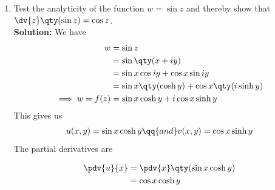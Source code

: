 \begin{enumerate}
			\begin{multicols}{2}
				\begin{align*}
					\pdv{v}{x}&=\pdv{x}\qty(e^x\sin{y}) \\
						&=e^x\sin{y}
				\end{align*}
				
				\begin{align*}
					\pdv{v}{y}&=\pdv{y}\qty(e^x\sin{y}) \\
						&=e^x\cos{y}
				\end{align*}
			\end{multicols}
			From the above partial derivatives, we find that
			\begin{align*}
				\pdv{u}{x}=\pdv{v}{y}\qq{and}\pdv{u}{y}=-\pdv{v}{x}
			\end{align*}
			Hence the Cauchy-Riemann conditions are satisfied. Also the partial derivatives $\pdv{u}{x}$, $\pdv{u}{y}$, $\pdv{v}{x}$ and $\pdv{v}{y}$ are continuous everywhere.
			
			Therefore the complex function $f(z)=e^x\qty(\cos{y}+i\sin{y})$ is analytic everywhere.
			
			Finally, the derivative of the given function is obtained as
			\begin{align*}
				f'(z)&=\pdv{u}{x}+i\pdv{v}{x} \\
					&=e^x\cos{y}+ie^x\sin{y} \\
				\implies f'(z)&=e^x\qty(\cos{y}+i\sin{y})
			\end{align*}
			
			\item Test the analyticity of the function $w=\sin{z}$ and thereby show that $\dv{z}\qty(\sin{z})=\cos{z}$.\\
			\textbf{Solution:} We have
			\begin{align*}
				w&=\sin{z} \\
					&=\sin\qty(x+iy) \\
					&=\sin{x}\cos{iy}+\cos{x}\sin{iy} \\
					&=\sin{x}\qty(\cosh{y})+\cos{x}\qty(i\sinh{y}) \\
				\implies w=f(z)&=\sin{x}\cosh{y}+i\cos{x}\sinh{y}
			\end{align*}
			This gives us
			\begin{align*}
				u(x,y)=\sin{x}\cosh{y}\qq{and}v(x,y)=\cos{x}\sinh{y}
			\end{align*}
			The partial derivatives are\vspace{-3ex}
			\begin{multicols}{2}
				\begin{align*}
					\pdv{u}{x}&=\pdv{x}\qty(\sin{x}\cosh{y}) \\
						&=\cos{x}\cosh{y}
				\end{align*}
				

\end{multicols}
\end{enumerate}
